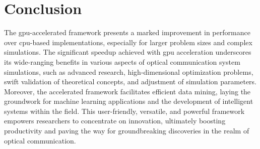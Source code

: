 \section{Conclusion}
The \acrshort{gpu}-accelerated framework presents a marked improvement in performance over \acrshort{cpu}-based implementations, especially for larger problem sizes and complex simulations. The significant speedup achieved with \acrshort{gpu} acceleration underscores its wide-ranging benefits in various aspects of optical communication system simulations, such as advanced research, high-dimensional optimization problems, swift validation of theoretical concepts, and adjustment of simulation parameters. Moreover, the accelerated framework facilitates efficient data mining, laying the groundwork for machine learning applications and the development of intelligent systems within the field. This user-friendly, versatile, and powerful framework empowers researchers to concentrate on innovation, ultimately boosting productivity and paving the way for groundbreaking discoveries in the realm of optical communication.